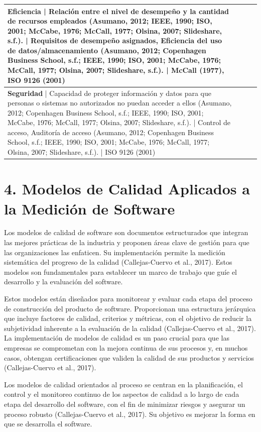 \documentclass[11pt]{article}
\begin{document}
\begin{table}[h!]
\begin{tabular}{|l|l|l|l|}
\hline
\textbf{Eficiencia} | Relación entre el nivel de desempeño y la cantidad de recursos empleados (Asumano, 2012; IEEE, 1990; ISO, 2001; McCabe, 1976; McCall, 1977; Olsina, 2007; Slideshare, s.f.). | Requisitos de desempeño asignados, Eficiencia del uso de datos/almacenamiento (Asumano, 2012; Copenhagen Business School, s.f.; IEEE, 1990; ISO, 2001; McCabe, 1976; McCall, 1977; Olsina, 2007; Slideshare, s.f.). | McCall (1977), ISO 9126 (2001) \\
\hline
\textbf{Seguridad} | Capacidad de proteger información y datos para que personas o sistemas no autorizados no puedan acceder a ellos (Asumano, 2012; Copenhagen Business School, s.f.; IEEE, 1990; ISO, 2001; McCabe, 1976; McCall, 1977; Olsina, 2007; Slideshare, s.f.). | Control de acceso, Auditoría de acceso (Asumano, 2012; Copenhagen Business School, s.f.; IEEE, 1990; ISO, 2001; McCabe, 1976; McCall, 1977; Olsina, 2007; Slideshare, s.f.). | ISO 9126 (2001) \\
\hline
\end{tabular}
\end{table}

\section{4. Modelos de Calidad Aplicados a la Medición de Software}

Los modelos de calidad de software son documentos estructurados que integran las mejores prácticas de la industria y proponen áreas clave de gestión para que las organizaciones las enfaticen. Su implementación permite la medición sistemática del progreso de la calidad (Callejas-Cuervo et al., 2017). Estos modelos son fundamentales para establecer un marco de trabajo que guíe el desarrollo y la evaluación del software.

Estos modelos están diseñados para monitorear y evaluar cada etapa del proceso de construcción del producto de software. Proporcionan una estructura jerárquica que incluye factores de calidad, criterios y métricas, con el objetivo de reducir la subjetividad inherente a la evaluación de la calidad (Callejas-Cuervo et al., 2017). La implementación de modelos de calidad es un paso crucial para que las empresas se comprometan con la mejora continua de sus procesos y, en muchos casos, obtengan certificaciones que validen la calidad de sus productos y servicios (Callejas-Cuervo et al., 2017).

Los modelos de calidad orientados al proceso se centran en la planificación, el control y el monitoreo continuo de los aspectos de calidad a lo largo de cada etapa del desarrollo del software, con el fin de minimizar riesgos y asegurar un proceso robusto (Callejas-Cuervo et al., 2017). Su objetivo es mejorar la forma en que se desarrolla el software.
\end{document}
